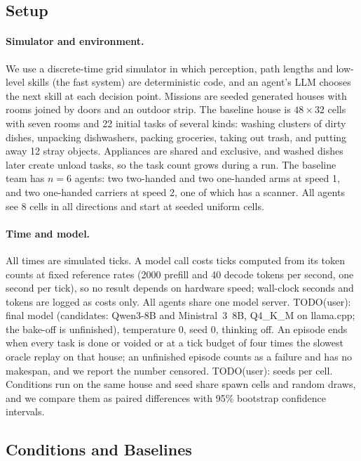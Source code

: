 \documentclass[letterpaper]{article}
\begin{document}
\subsection{Setup}
\label{sec:setup}

\paragraph{Simulator and environment.}
We use a discrete-time grid simulator in which perception, path lengths and low-level skills (the fast system) are deterministic code, and an agent's LLM chooses the next skill at each decision point. Missions are seeded generated houses with rooms joined by doors and an outdoor strip. The baseline house is $48\times32$ cells with seven rooms and 22 initial tasks of several kinds: washing clusters of dirty dishes, unpacking dishwashers, packing groceries, taking out trash, and putting away 12 stray objects. Appliances are shared and exclusive, and washed dishes later create unload tasks, so the task count grows during a run. The baseline team has $n=6$ agents: two two-handed and two one-handed arms at speed 1, and two one-handed carriers at speed 2, one of which has a scanner. All agents see 8 cells in all directions and start at seeded uniform cells.

\paragraph{Time and model.}
All times are simulated ticks. A model call costs ticks computed from its token counts at fixed reference rates (2000 prefill and 40 decode tokens per second, one second per tick), so no result depends on hardware speed; wall-clock seconds and tokens are logged as costs only. All agents share one model server. TODO(user): final model (candidates: Qwen3-8B and Ministral~3~8B, Q4\_K\_M on llama.cpp; the bake-off is unfinished), temperature 0, seed 0, thinking off. An episode ends when every task is done or voided or at a tick budget of four times the slowest oracle replay on that house; an unfinished episode counts as a failure and has no makespan, and we report the number censored. TODO(user): seeds per cell. Conditions run on the same house and seed share spawn cells and random draws, and we compare them as paired differences with 95\% bootstrap confidence intervals.

\subsection{Conditions and Baselines}
\end{document}
